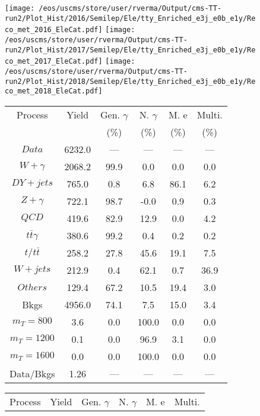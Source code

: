 \begin{figure}
\centering
\texttt{[image: /eos/uscms/store/user/rverma/Output/cms-TT-run2/Plot\_Hist/2016/Semilep/Ele/tty\_Enriched\_e3j\_e0b\_e1y/Reco\_met\_2016\_EleCat.pdf]}
\texttt{[image: /eos/uscms/store/user/rverma/Output/cms-TT-run2/Plot\_Hist/2017/Semilep/Ele/tty\_Enriched\_e3j\_e0b\_e1y/Reco\_met\_2017\_EleCat.pdf]}
\texttt{[image: /eos/uscms/store/user/rverma/Output/cms-TT-run2/Plot\_Hist/2018/Semilep/Ele/tty\_Enriched\_e3j\_e0b\_e1y/Reco\_met\_2018\_EleCat.pdf]}
\begin{minipage}[c]{0.32\textwidth}
\centering
\tiny{
\begin{tabular}{cccccc}
\hline
Process & Yield & Gen. $\gamma$ & N. $\gamma$ & M. e & Multi. \\
 &  & (\%) & (\%) & (\%) & (\%)  \\
\hline
                                                                      $ Data $ &  6232.0 &  --- &  --- &  --- &  ---\\
$ W+\gamma $ &  2068.2 &  99.9 &  0.0 &  0.0 &  0.0\\
$ DY+jets $ &  765.0 &  0.8 &  6.8 &  86.1 &  6.2\\
$ Z+\gamma $ &  722.1 &  98.7 &  -0.0 &  0.9 &  0.3\\
$ QCD $ &  419.6 &  82.9 &  12.9 &  0.0 &  4.2\\
$ t\bar{t}\gamma $ &  380.6 &  99.2 &  0.4 &  0.2 &  0.2\\
$ t/t\bar{t} $ &  258.2 &  27.8 &  45.6 &  19.1 &  7.5\\
$ W+jets $ &  212.9 &  0.4 &  62.1 &  0.7 &  36.9\\
$ Others $ &  129.4 &  67.2 &  10.5 &  19.4 &  3.0\\
Bkgs &  4956.0 &  74.1 &  7.5 &  15.0 &  3.4\\
$ m_{T} = 800 $ &  3.6 &  0.0 &  100.0 &  0.0 &  0.0\\
$ m_{T} = 1200 $ &  0.1 &  0.0 &  96.9 &  3.1 &  0.0\\
$ m_{T} = 1600 $ &  0.0 &  0.0 &  100.0 &  0.0 &  0.0\\
Data/Bkgs &  1.26 &  --- &  --- &  --- &  ---\\
\hline
\end{tabular}
}
\end{minipage}
\begin{minipage}[c]{0.32\textwidth}
\centering
\tiny{
\begin{tabular}{cccccc}
\hline
Process & Yield & Gen. $\gamma$ & N. $\gamma$ & M. e & Multi. \\

\end{tabular}}
\end{minipage}
\end{figure}
